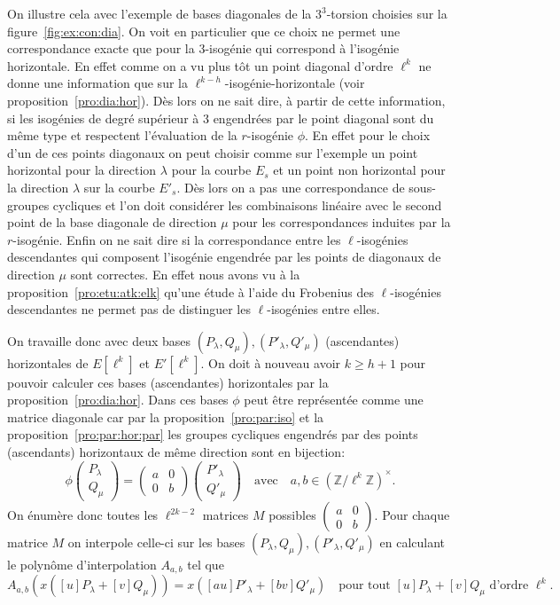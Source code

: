 \documentclass[10pt,a4paper]{book}
\theoremstyle{plain}
\theoremstyle{definition}
\theoremstyle{definition}
\theoremstyle{definition}
\theoremstyle{definition}
\theoremstyle{definition}
\theoremstyle{remark}
\theoremstyle{remark}
\theoremstyle{definition}
\begin{document}
On illustre cela avec l'exemple de bases diagonales de la $3^3$-torsion 
choisies sur la figure~\ref{fig:ex:con:dia}. On voit en 
particulier que ce choix ne permet une correspondance exacte que pour la 
$3$-isogénie qui correspond à l'isogénie horizontale. En effet comme on a vu
plus tôt un point diagonal d'ordre $\ell^k$ ne donne une information que sur la
$\ell^{k-h}$-isogénie-horizontale (voir proposition~\ref{pro:dia:hor}). Dès 
lors on ne sait dire, à partir de cette information, si les isogénies de degré 
supérieur à $3$ engendrées par le point diagonal sont du même type et respectent
l'évaluation de la $r$-isogénie $\phi$. En effet pour le choix d'un de ces points 
diagonaux on peut choisir comme sur l'exemple un point horizontal pour la 
direction $ \lambda$ pour la courbe $E_s$ et un point non horizontal
pour la direction $\lambda$ sur la courbe $E'_s$.  Dès lors on a 
pas une correspondance de sous-groupes cycliques et l'on doit considérer les 
combinaisons linéaire avec le second point de la base diagonale de direction 
$\mu$ pour les correspondances induites par la $r$-isogénie. Enfin
on ne sait dire si la correspondance entre les $\ell$-isogénies descendantes 
qui composent l'isogénie engendrée par les points de diagonaux de direction 
$\mu$ sont correctes. En effet nous avons vu à la 
proposition~\ref{pro:etu:atk:elk} qu'une étude à l'aide du Frobenius des 
$\ell$-isogénies descendantes ne permet pas de distinguer les $\ell$-isogénies 
entre elles.

 On travaille donc avec deux bases $(P_{\lambda}, Q_{\mu}),(P'_{\lambda},
 Q'_{\mu})$ (ascendantes) horizontales de $E[\ell^k]$ et $E'[\ell^k]$.
 On doit à nouveau avoir $k \geqslant h +1$ pour pouvoir calculer ces bases 
(ascendantes) horizontales par la proposition~\ref{pro:dia:hor}.
 Dans ces bases $\phi$ 
 peut être représentée comme une matrice diagonale car par la 
 proposition~\ref{pro:par:iso} et la proposition~\ref{pro:par:hor:par} les 
 groupes cycliques engendrés par des points (ascendants) horizontaux de
 même direction sont en bijection:
\[
\phi
\left(
\begin{matrix}
 P_{\lambda} \\
 Q_{\mu} 
\end{matrix}
\right)= \left(\begin{matrix}
a & 0 \\
0 & b
\end{matrix} \right)
\left(
\begin{matrix}
P'_{\lambda} \\
Q'_{\mu}
\end{matrix}
\right)
\quad \text{avec} \quad a,b \in \left( \mathbb{Z}/\ell^k\mathbb{Z} \right)^{\times}.
\]
 On énumère donc toutes les $\ell^{2k-2}$ matrices $M$ possibles $\left( 
 \begin{smallmatrix} a & 0 \\ 0 & b \end{smallmatrix} \right)$. Pour chaque 
matrice $M$ on interpole celle-ci sur les bases $(P_{\lambda},Q_{\mu}),
(P'_{\lambda},Q'_{\mu})$ en calculant le polynôme d'interpolation $A_{a,b}$ tel
que 
\[
A_{a,b}(x([u]P_{\lambda} +[v]Q_{\mu}))=x([au]P'_{\lambda}+[bv]Q'_{\mu}) \quad 
\text{pour tout $[u]P_{\lambda}+[v]Q_{\mu}$ d'ordre $\ell^k$}.
\]
\end{document}
